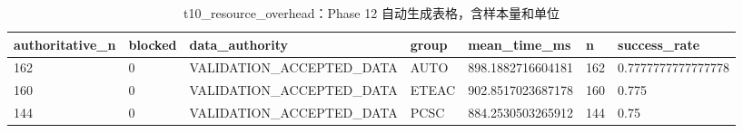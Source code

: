 \begin{table}[htbp]
\centering
\caption{t10_resource_overhead：Phase 12 自动生成表格，含样本量和单位}
\begin{tabular}{lllllll}
\hline
authoritative_n & blocked & data_authority & group & mean_time_ms & n & success_rate \\
\hline
162 & 0 & VALIDATION\_ACCEPTED\_DATA & AUTO & 898.1882716604181 & 162 & 0.7777777777777778 \\
160 & 0 & VALIDATION\_ACCEPTED\_DATA & ETEAC & 902.8517023687178 & 160 & 0.775 \\
144 & 0 & VALIDATION\_ACCEPTED\_DATA & PCSC & 884.2530503265912 & 144 & 0.75 \\
\hline
\end{tabular}
\end{table}
